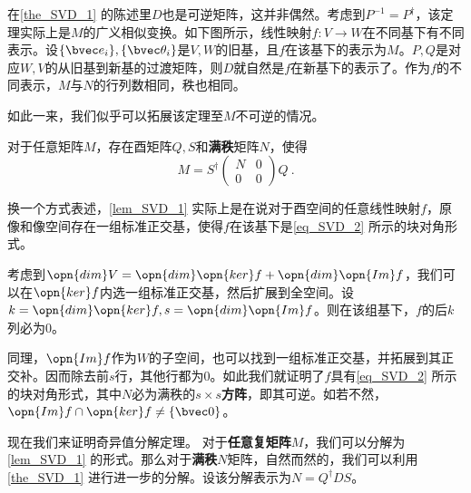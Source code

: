 在\autoref{the_SVD_1} 的陈述里$D$也是可逆矩阵，这并非偶然。考虑到$P^{-1}=P^{\dagger}$，该定理实际上是$M$的广义相似变换。如下图所示，线性映射$f:V\rightarrow W$在不同基下有不同表示。设$\{\bvec e_i\},\{\bvec \theta_i\}$是$V,W$的旧基，且$f$在该基下的表示为$M$。$P,Q$是对应$W,V$的从旧基到新基的过渡矩阵，则$D$就自然是$f$在新基下的表示了。作为$f$的不同表示，$M$与$N$的行列数相同，秩也相同。

如此一来，我们似乎可以拓展该定理至$M$不可逆的情况。

\begin{lemma}{}\label{lem_SVD_1}
对于任意矩阵$M$，存在酉矩阵$Q,S$和\textbf{满秩}矩阵$N$，使得
\begin{equation}\label{eq_SVD_2}
M=S^{\dagger}\left(\begin{array}{cc}
N & 0 \\
0 & 0
\end{array}\right) Q~.
\end{equation}
\end{lemma}


换一个方式表述，\autoref{lem_SVD_1} 实际上是在说对于酉空间的任意线性映射$f$，原像和像空间存在一组标准正交基，使得$f$在该基下是\autoref{eq_SVD_2} 所示的块对角形式。

考虑到$\opn{dim}V=\opn{dim}\opn{ker}f+\opn{dim}\opn{Im}f$，我们可以在$\opn{ker}f$内选一组标准正交基，然后扩展到全空间。设$k=\opn{dim}\opn{ker}f,s=\opn{dim}\opn{Im}f$。则在该组基下，$f$的后$k$列必为$0$。

同理，$\opn{Im}f$作为$W$的子空间，也可以找到一组标准正交基，并拓展到其正交补。因而除去前$s$行，其他行都为$0$。如此我们就证明了$f$具有\autoref{eq_SVD_2} 所示的块对角形式，其中$N$必为满秩的$s\times s$\textbf{方阵}，即其可逆。如若不然，$\opn{Im}f\cap\opn{ker}f\neq\{\bvec 0\}$。

现在我们来证明奇异值分解定理。
对于\textbf{任意复矩阵}$M$，我们可以分解为\autoref{lem_SVD_1} 的形式。那么对于\textbf{满秩}$N$矩阵，自然而然的，我们可以利用\autoref{the_SVD_1} 进行进一步的分解。设该分解表示为$N=Q^{\dagger}DS$。












